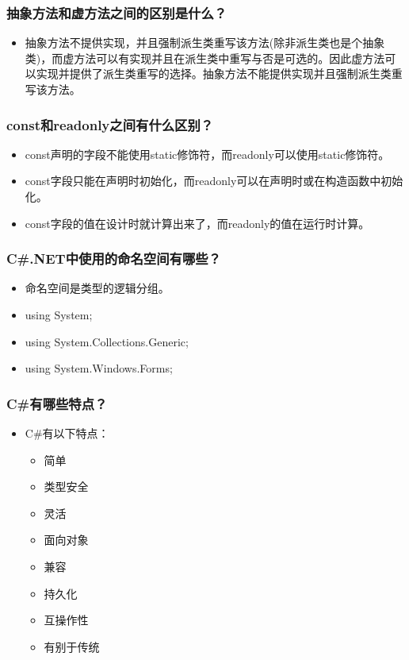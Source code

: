 \documentclass[9pt, b5paper]{article}
\begin{document}
\subsubsection{抽象方法和虚方法之间的区别是什么？}
\label{sec-1-2-55}
\begin{itemize}
\item 抽象方法不提供实现，并且强制派生类重写该方法(除非派生类也是个抽象类)，而虚方法可以有实现并且在派生类中重写与否是可选的。因此虚方法可以实现并提供了派生类重写的选择。抽象方法不能提供实现并且强制派生类重写该方法。
\end{itemize}
\subsubsection{const和readonly之间有什么区别？}
\label{sec-1-2-56}
\begin{itemize}
\item const声明的字段不能使用static修饰符，而readonly可以使用static修饰符。
\item const字段只能在声明时初始化，而readonly可以在声明时或在构造函数中初始化。
\item const字段的值在设计时就计算出来了，而readonly的值在运行时计算。
\end{itemize}
\subsubsection{C\#.NET中使用的命名空间有哪些？}
\label{sec-1-2-57}
\begin{itemize}
\item 命名空间是类型的逻辑分组。
\item using System;
\item using System.Collections.Generic;
\item using System.Windows.Forms;
\end{itemize}
\subsubsection{C\#有哪些特点？}
\label{sec-1-2-58}
\begin{itemize}
\item C\#有以下特点：
\begin{itemize}
\item 简单
\item 类型安全
\item 灵活
\item 面向对象
\item 兼容
\item 持久化
\item 互操作性
\item 有别于传统
\end{itemize}
\end{itemize}
\end{document}
